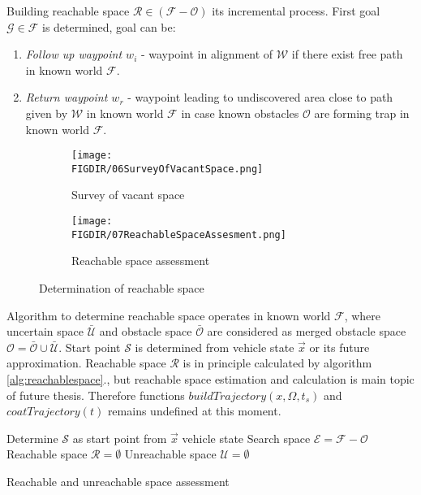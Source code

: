 Building reachable space $\mathscr{R} \in (\mathscr{F} - \mathscr{O})$ its incremental process. First goal $\mathscr{G} \in \mathscr{F}$ is determined, goal can be:
\begin{enumerate}
    \item\textit{Follow up waypoint $w_i$} - waypoint in alignment of $\mathscr{W}$ if there exist free path in known world $\mathscr{F}$.
    \item\textit{Return waypoint $w_r$} - waypoint leading to undiscovered area close to path given by $\mathscr{W}$ in known world $\mathscr{F}$ in case known obstacles $\mathscr{O}$ are forming trap in known world $\mathscr{F}$.
\end{enumerate}

\begin{figure}[H]
    \begin{subfigure}{0.5\textwidth}
    \texttt{[image: \\FIGDIR/06SurveyOfVacantSpace.png]} 
    \caption{Survey of vacant space}
    \label{fig:SurveyOfVacantSpace}
    \end{subfigure}
    \begin{subfigure}{0.5\textwidth}
    \texttt{[image: \\FIGDIR/07ReachableSpaceAssesment.png]}
    \caption{Reachable space assessment}
    \label{fig:ReachableSpaceAssesment}
    \end{subfigure}
\caption{Determination of reachable space}
\label{fig:ReachableSpace}
\end{figure}
Algorithm to determine reachable space operates in known world $\mathscr{F}$, where uncertain space $\bar{\mathscr{U}}$ and obstacle space $\bar{\mathscr{O}}$ are considered as merged obstacle space $\mathscr{O}=\bar{\mathscr{O}}\cup\bar{\mathscr{U}}$. Start point $\mathscr{S}$ is determined from vehicle state $\vec{x}$ or its future approximation. Reachable space $\mathscr{R}$ is in principle calculated by algorithm \ref{alg:reachablespace}., but reachable space estimation and calculation is main topic of future thesis. Therefore functions $buildTrajectory(x,\Omega,t_s)$ and $coatTrajectory(t)$ remains undefined at this moment.

\begin{algorithm}[H]
Determine $\mathscr{S}$ as start point from $\vec{x}$ vehicle state\;
Search space $\mathscr{E} = \mathscr{F}-\mathscr{O}$\;
Reachable space $\mathscr{R} =\emptyset$\;
Unreachable space $\mathscr{U}=\emptyset$\;
\caption{Reachable and unreachable space assessment}
\label{alg:reachablespace}
\end{algorithm}


